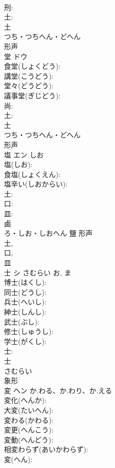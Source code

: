 \documentclass[8pt]{extreport}
\begin{document}
\begin{CJK}{UTF8}{min}
\\	刑: 
\\	土: 
\\	土	
\\	つち・つちへん・どへん	
\\	形声 
\\	堂	ドウ			
\\	食堂(しょくどう): 
\\	講堂(こうどう): 
\\	堂々(どうどう): 
\\	議事堂(ぎじどう): 
\\	尚: 
\\	土: 
\\	土	
\\	つち・つちへん・どへん	
\\	形声 
\\	塩	エン	しお		
\\	塩(しお): 
\\	食塩(しょくえん): 
\\	塩辛い(しおからい): 
\\	土: 
\\	口: 
\\	皿: 
\\	鹵	
\\	ろ・しお・しおへん	鹽	形声 
\\	土, 
\\	口, 
\\	皿 
\\	士	シ	さむらい	お, ま	
\\	博士(はくし): 
\\	同士(どうし): 
\\	兵士(へいし): 
\\	紳士(しんし): 
\\	武士(ぶし): 
\\	修士(しゅうし): 
\\	学士(がくし): 
\\	士: 
\\	士	
\\	さむらい	
\\	象形 
\\	変	ヘン	か.わる、か.わり、か.える		
\\	変化(へんか): 
\\	大変(たいへん): 
\\	変わる(かわる): 
\\	変更(へんこう): 
\\	変動(へんどう): 
\\	相変わらず(あいかわらず): 
\\	変(へん): 

\end{CJK}
\end{document}
